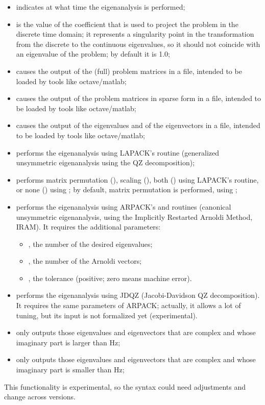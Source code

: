 \begin{itemize}
\item {} indicates at what time the eigenanalysis is performed;
\item {} is the value of the coefficient that is used to project
	the problem in the discrete time domain; it represents
	a singularity point in the transformation from the discrete
	to the continuous eigenvalues, so it should not coincide with
	an eigenvalue of the problem;  by default it is 1.0;
\item {} causes the output
	of the (full) problem matrices in a  file,
	intended to be loaded by tools like octave/matlab;
\item {} causes the output
	of the problem matrices in sparse form in a  file,
	intended to be loaded by tools like octave/matlab;
\item {} causes the output of the eigenvalues
	and of the eigenvectors in a  file,
	intended to be loaded by tools like octave/matlab;
\item {} performs the eigenanalysis using
	LAPACK's  routine (generalized unsymmetric eigenanalysis
	using the QZ decomposition);
\item {} performs matrix permutation (),
	scaling (), both () using LAPACK's
	 routine, or none () using ;
	by default, matrix permutation is performed, using ;
\item {} performs the eigenanalysis using
	ARPACK's  and  routines
	(canonical unsymmetric eigenanalysis,
	using the Implicitly Restarted Arnoldi Method, IRAM).
	It requires the additional parameters:
	\begin{itemize}
	\item {}, the number of the desired eigenvalues;
	\item {}, the number of the Arnoldi vectors;
	\item {}, the tolerance (positive; zero means machine error).
	\end{itemize}
\item {} performs the eigenanalysis using JDQZ (Jacobi-Davidson QZ
	decomposition).
	It requires the same parameters of ARPACK;
	actually, it allows a lot of tuning, but its input
	is not formalized yet (experimental).
\item {} only outputs those eigenvalues and eigenvectors
	that are complex and whose imaginary part is larger than
	 Hz;
\item {} only outputs those eigenvalues and eigenvectors
	that are complex and whose imaginary part is smaller than
	 Hz;
\end{itemize}
This functionality is experimental, so the syntax could need adjustments
and change across versions.


